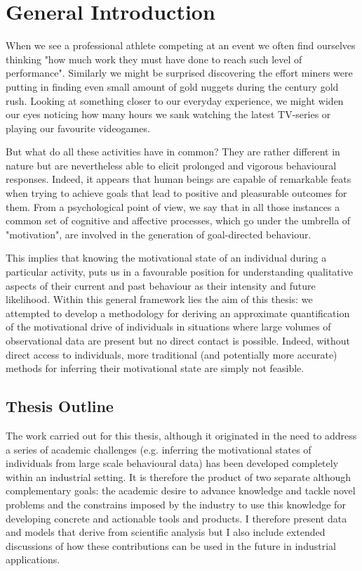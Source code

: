 \chapter{General Introduction}
\label{chapter_general_intro}

When we see a professional athlete competing at an event we often find ourselves thinking "how much work they must have done to reach such level of performance". Similarly we might be surprised discovering the effort miners were putting in finding even small amount of gold nuggets during the  century gold rush. Looking at something closer to our everyday experience, we might widen our eyes noticing how many hours we sank watching the latest TV-series or playing our favourite videogames. 

But what do all these activities have in common? They are rather different in nature but are nevertheless able to elicit prolonged and vigorous behavioural responses. Indeed, it appears that human beings are capable of remarkable feats when trying to achieve goals that lead to positive and pleasurable outcomes for them. From a psychological point of view, we say that in all those instances a common set of cognitive and affective processes, which go under the umbrella of "motivation", are involved in the generation of goal-directed behaviour. 

This implies that knowing the motivational state of an individual during a particular activity, puts us in a favourable position for understanding qualitative aspects of their current and past behaviour as their intensity and future likelihood. Within this general framework lies the aim of this thesis:  we attempted to develop a methodology for deriving an approximate quantification of the motivational drive of individuals in situations where large volumes of observational data are present but no direct contact is possible. Indeed, without direct access to individuals, more traditional (and potentially more accurate) methods for inferring their motivational state are simply not feasible.

\section*{Thesis Outline}
The work carried out for this thesis, although it originated in the need to address a series of academic challenges (e.g. inferring the motivational states of individuals from large scale behavioural data) has been developed completely within an industrial setting. It is therefore the product of two separate although complementary goals: the academic desire to advance knowledge and tackle novel problems and the constrains imposed by the industry to use this knowledge for developing concrete and actionable tools and products. I therefore present data and models that derive from scientific analysis but I also include extended discussions of how these contributions can be used in the future in industrial applications. 


